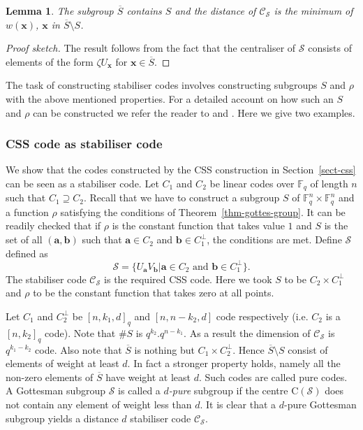 \documentclass[11pt,twoside]{article}
\newtheorem{lemma}[theorem]{Lemma}
\theoremstyle{definition}
\theoremstyle{remark}
\newcommand{\Weight}[1]{\ensuremath{w\left(#1\right)}}
\newcommand{\Centre}[1]{\ensuremath{\mathrm{C}\left(#1\right)}}
\newcommand{\GF}[0]{\ensuremath{\mathbb{F}}}
\begin{document}
\begin{lemma}
  The subgroup $\overline{S}$ contains $S$ and the distance of
  $\mathcal{C}_\mathcal{S}$ is the minimum of $\Weight{\mathbf{x}}$,
  $\mathbf{x}$ in $\overline{S} \setminus S$.
\end{lemma}
\begin{proof}[Proof sketch]
  The result follows from the fact that the centraliser of
  $\mathcal{S}$ consists of elements of the form $\zeta U_\mathbf{x}$
  for $\mathbf{x} \in \overline{S}$.
\end{proof}
  
The task of constructing stabiliser codes involves constructing
subgroups $S$ and $\rho$ with the above mentioned properties. For a
detailed account on how such an $S$ and $\rho$ can be constructed we
refer the reader to \cite{calderbank98quantum} and
\cite{arvind2003family}. Here we give two examples.

\subsubsection*{CSS code as stabiliser code}

We show that the codes constructed by the CSS construction in
Section~\ref{sect-css} can be seen as a stabiliser code. Let $C_1$ and
$C_2$ be linear codes over $\GF_q$ of length $n$ such that $C_1
\supseteq C_2$.  Recall that we have to construct a subgroup $S$ of
$\GF_q^n \times \GF_q^n$ and a function $\rho$ satisfying the
conditions of Theorem~\ref{thm-gottes-group}. It can be readily
checked that if $\rho$ is the constant function that takes value $1$
and $S$ is the set of all $(\mathbf{a},\mathbf{b})$ such that
$\mathbf{a} \in C_2$ and $\mathbf{b} \in C_1^\perp$, the conditions
are met.  Define $\mathcal{S}$ defined as
\[
\mathcal{S} = \{ U_\mathbf{a} V_\mathbf{b} | \mathbf{a} \in C_2
\textrm{ and } \mathbf{b} \in C_1^\perp \}.
\]
The stabiliser code $\mathcal{C}_\mathcal{S}$ is the required CSS
code. Here we took $S$ to be $C_2 \times C_1^\perp$ and $\rho$ to be
the constant function that takes zero at all points.

Let $C_1$ and $C_2^\perp$ be $[n,k_1,d]_q$ and $[n,n-k_2,d]$ code
respectively (i.e. $C_2$ is a $[n,k_2]_q$ code). Note that $\# S$ is
$q^{k_2} . q^{n - k_1}$. As a result the dimension of
$\mathcal{C}_\mathcal{S}$ is $q^{k_1 - k_2}$ code. Also note that
$\overline{S}$ is nothing but $C_1 \times C_2^\perp$. Hence
$\overline{S} \setminus S$ consist of elements of weight at least $d$.
In fact a stronger property holds, namely all the non-zero elements of
$\overline{S}$ have weight at least $d$.  Such codes are called pure
codes. A Gottesman subgroup $\mathcal{S}$ is called a \emph{$d$-pure}
subgroup if the centre $\Centre{\mathcal{S}}$ does not contain any
element of weight less than $d$. It is clear that a $d$-pure Gottesman
subgroup yields a distance $d$ stabiliser code
$\mathcal{C}_\mathcal{S}$.
\end{document}
